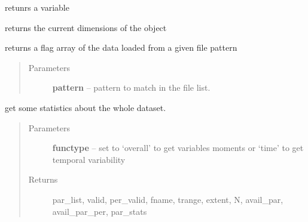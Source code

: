 \documentclass[letterpaper,10pt,english]{sphinxmanual}
\begin{document}
\begin{fulllineitems}

\begin{fulllineitems}
\label{altimetry.data:altimetry.data.hydro_data.get}
retunrs a variable

\end{fulllineitems}


\begin{fulllineitems}
\label{altimetry.data:altimetry.data.hydro_data.get_currentDim}
returns the current dimensions of the object

\end{fulllineitems}


\begin{fulllineitems}
\label{altimetry.data:altimetry.data.hydro_data.get_file}
returns a flag array of the data loaded from a given file pattern
\begin{quote}\begin{description}
\item[{Parameters}] \leavevmode
\textbf{pattern} -- pattern to match in the file list.

\end{description}\end{quote}

\end{fulllineitems}


\begin{fulllineitems}
\label{altimetry.data:altimetry.data.hydro_data.get_object_stats}
get some statistics about the whole dataset.
\begin{quote}\begin{description}
\item[{Parameters}] \leavevmode
\textbf{functype} -- set to `overall' to get variables moments or `time' to get temporal variability

\item[{Returns}] \leavevmode
par\_list, valid, per\_valid, fname, trange, extent, N, avail\_par, avail\_par\_per, par\_stats


\end{description}
\end{quote}
\end{fulllineitems}
\end{fulllineitems}
\end{document}
